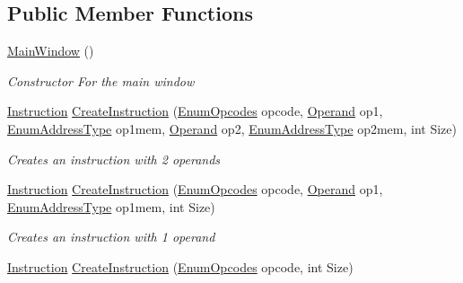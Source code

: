 \subsection*{Public Member Functions}
\begin{DoxyCompactItemize}
\item 
\hyperlink{class_c_p_u___o_s___simulator_1_1_main_window_a33462505a86657583c1560cbf02172bd}{Main\+Window} ()
\begin{DoxyCompactList}\small\item\em Constructor For the main window \end{DoxyCompactList}\item 
\hyperlink{class_c_p_u___o_s___simulator_1_1_c_p_u_1_1_instruction}{Instruction} \hyperlink{class_c_p_u___o_s___simulator_1_1_main_window_a0a9f8f5c689d20dc6ee446e1bb3e890e}{Create\+Instruction} (\hyperlink{namespace_c_p_u___o_s___simulator_1_1_c_p_u_ac29c87bff87ad404c953b2581024043e}{Enum\+Opcodes} opcode, \hyperlink{class_c_p_u___o_s___simulator_1_1_c_p_u_1_1_operand}{Operand} op1, \hyperlink{namespace_c_p_u___o_s___simulator_1_1_c_p_u_ab76721f84dabbc14c907e6f11fbeb7c0}{Enum\+Address\+Type} op1mem, \hyperlink{class_c_p_u___o_s___simulator_1_1_c_p_u_1_1_operand}{Operand} op2, \hyperlink{namespace_c_p_u___o_s___simulator_1_1_c_p_u_ab76721f84dabbc14c907e6f11fbeb7c0}{Enum\+Address\+Type} op2mem, int Size)
\begin{DoxyCompactList}\small\item\em Creates an instruction with 2 operands \end{DoxyCompactList}\item 
\hyperlink{class_c_p_u___o_s___simulator_1_1_c_p_u_1_1_instruction}{Instruction} \hyperlink{class_c_p_u___o_s___simulator_1_1_main_window_ae96963106cfb80b7f48548ae6dbf9859}{Create\+Instruction} (\hyperlink{namespace_c_p_u___o_s___simulator_1_1_c_p_u_ac29c87bff87ad404c953b2581024043e}{Enum\+Opcodes} opcode, \hyperlink{class_c_p_u___o_s___simulator_1_1_c_p_u_1_1_operand}{Operand} op1, \hyperlink{namespace_c_p_u___o_s___simulator_1_1_c_p_u_ab76721f84dabbc14c907e6f11fbeb7c0}{Enum\+Address\+Type} op1mem, int Size)
\begin{DoxyCompactList}\small\item\em Creates an instruction with 1 operand \end{DoxyCompactList}\item 
\hyperlink{class_c_p_u___o_s___simulator_1_1_c_p_u_1_1_instruction}{Instruction} \hyperlink{class_c_p_u___o_s___simulator_1_1_main_window_a608bc25c49d397aacde6cdd41d4314c3}{Create\+Instruction} (\hyperlink{namespace_c_p_u___o_s___simulator_1_1_c_p_u_ac29c87bff87ad404c953b2581024043e}{Enum\+Opcodes} opcode, int Size)

\end{DoxyCompactItemize}
